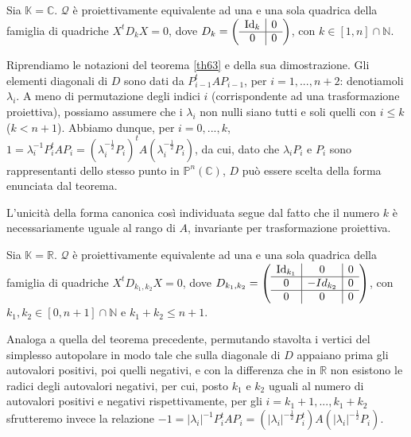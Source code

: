 \begin{Theorem}\label{th64}
	 Sia $\mathbb{K} = \mathbb{C}$. $\mathcal{Q}$ \`e proiettivamente equivalente ad una e una sola quadrica della famiglia di quadriche $X^tD_kX = 0$, dove $D_k = \left ( \begin{array}{c|c} \Identity_k & 0\\\hline 0 & 0 \end{array} \right )$, con $k \in [1, n] \cap \mathbb{N}$.
\end{Theorem}
\Proof Riprendiamo le notazioni del teorema \ref{th63} e della sua dimostrazione. Gli elementi diagonali di $D$ sono dati da $P_{i - 1}^tAP_{i - 1}$, per $i = 1, ..., n + 2$: denotiamoli $\lambda_i$. A meno di permutazione degli indici $i$ (corrispondente ad una trasformazione proiettiva), possiamo assumere che i $\lambda_i$ non nulli siano tutti e soli quelli con $i \leq k$ ($k < n + 1$). Abbiamo dunque, per $i = 0, ..., k$, $1 = \lambda_i^{-1} P_i^tAP_i = (\lambda_i^{-\frac{1}{2}}P_i)^tA(\lambda_i^{-\frac{1}{2}} P_i)$, da cui, dato che $\lambda_i P_i$ e $P_i$ sono rappresentanti dello stesso punto in $\mathbb{P}^n(\mathbb{C})$, $D$ pu\`o essere scelta della forma enunciata dal teorema.
	\par L'unicit\`a della forma canonica cos\`i individuata segue dal fatto che il numero $k$ \`e necessariamente uguale al rango di $A$, invariante per trasformazione proiettiva. \EndProof
\begin{Theorem}\label{th65}
	 Sia $\mathbb{K} = \mathbb{R}$. $\mathcal{Q}$ \`e proiettivamente equivalente ad una e una sola quadrica della famiglia di quadriche $X^tD_{k_1, k_2}X = 0$, dove $D_{k_1, k_2} = \left ( \begin{array}{c|c|c} \Identity_{k_1} & 0 & 0\\\hline 0 & - Id_{k_2} & 0\\\hline 0& 0& 0\end{array} \right )$, con $k_1, k_2 \in [0, n + 1] \cap \mathbb{N}$ e $k_1 + k_2 \leq n + 1$.
\end{Theorem}
\Proof Analoga a quella del teorema precedente, permutando stavolta i vertici del simplesso autopolare in modo tale che sulla diagonale di $D$ appaiano prima gli autovalori positivi, poi quelli negativi, e con la differenza che in $\mathbb{R}$ non esistono le radici degli autovalori negativi, per cui, posto $k_1$ e $k_2$ uguali al numero di autovalori positivi e negativi rispettivamente, per gli $i = k_1 + 1, ..., k_1 + k_2$ sfrutteremo invece la relazione $- 1 = \left | \lambda_i \right |^{-1} P_i^tAP_i = (\left | \lambda_i \right | ^{-\frac{1}{2}} P_i^t)A(\left | \lambda_i \right | ^{-\frac{1}{2}} P_i)$.
